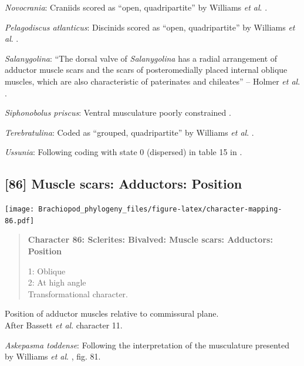 \documentclass[openany]{book}
\begin{document}
\hypertarget{Novocrania-coding-85}{}
\emph{Novocrania}: Craniids scored as ``open, quadripartite'' by
Williams \emph{et al}. \citeyearpar{Williams1996Asupra}.

\hypertarget{Pelagodiscus_atlanticus-coding-85}{}
\emph{Pelagodiscus atlanticus}: Discinids scored as ``open,
quadripartite'' by Williams \emph{et al}.
\citeyearpar{Williams1996Asupra}.

\hypertarget{Salanygolina-coding-85}{}
\emph{Salanygolina}: ``The dorsal valve of \emph{Salanygolina} has a
radial arrangement of adductor muscle scars and the scars of
posteromedially placed internal oblique muscles, which are also
characteristic of paterinates and chileates'' -- Holmer \emph{et al}.
\citeyearpar{Holmer2009Theenigmatic}.

\hypertarget{Siphonobolus_priscus-coding-85}{}
\emph{Siphonobolus priscus}: Ventral musculature poorly constrained
\citep{Williams2000LinguliformeaCraniiformea, Popov2009Earlyontogeny}.

\hypertarget{Terebratulina-coding-85}{}
\emph{Terebratulina}: Coded as ``grouped, quadripartite'' by Williams
\emph{et al}. \citeyearpar{Williams1996Asupra}.

\hypertarget{Ussunia-coding-85}{}
\emph{Ussunia}: Following coding with state 0 (dispersed) in table 15 in
\citet{Williams2000LinguliformeaCraniiformea}.

\subsection*{{[}86{]} Muscle scars: Adductors:
Position}\label{muscle-scars-adductors-position}

\texttt{[image: Brachiopod\_phylogeny\_files/figure-latex/character-mapping-86.pdf]}

\begin{quote}
\textbf{Character 86: Sclerites: Bivalved: Muscle scars: Adductors:
Position}

1: Oblique\\
2: At high angle\\
Transformational character.
\end{quote}

Position of adductor muscles relative to commissural plane.\\
After Bassett \emph{et al}.
\citeyearpar{Bassett2001Functionalmorphology} character 11.

\hypertarget{Askepasma_toddense-coding-86}{}
\emph{Askepasma toddense}: Following the interpretation of the
musculature presented by Williams \emph{et al}.
\citeyearpar{Williams2000LinguliformeaCraniiformea}, fig. 81.
\end{document}
